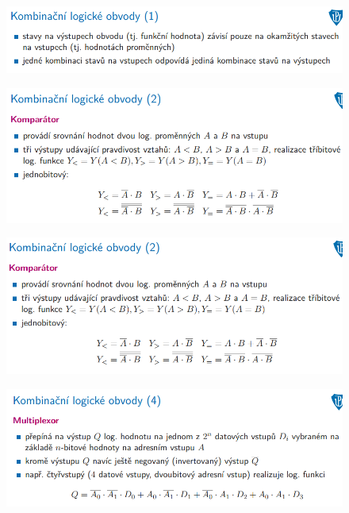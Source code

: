 \documentclass[10pt,a4paper]{article}
\begin{document}
\begin{figure} [h]
	\includegraphics[scale=0.65]{img/prvni_odstavec/otazka2/kombinacni_logicke_obvody1.png}	
\end{figure}

\begin{figure} [h]
	\includegraphics[scale=0.65]{img/prvni_odstavec/otazka2/kombinacni_logicke_obvody2.png}	
\end{figure}

\begin{figure} [h]
	\includegraphics[scale=0.65]{img/prvni_odstavec/otazka2/kombinacni_logicke_obvody3.png}	
\end{figure}

\begin{figure} [h]
	\includegraphics[scale=0.65]{img/prvni_odstavec/otazka2/kombinacni_logicke_obvody4.png}	
\end{figure}
\end{document}
